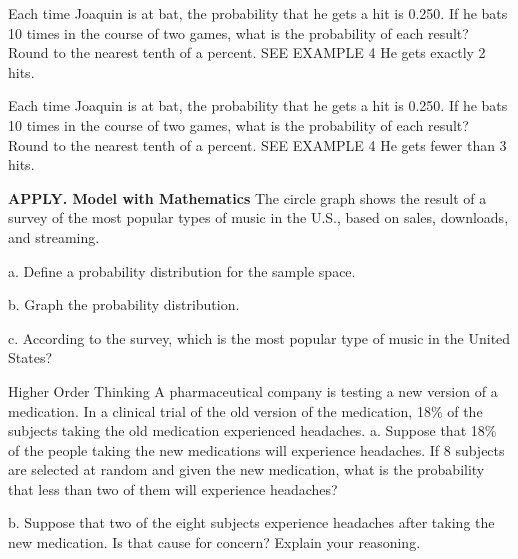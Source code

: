 \documentclass{article}
\newenvironment{practice}[2]{}{}        %
\newcommand{\answer}[1]{}               %
\newcommand{\placeholder}[2]{}          %
\begin{document}
\begin{practice}{25}{1}
Each time Joaquin is at bat, the probability that he gets a hit is 0.250. If he bats 10 times in the course of two games, what is the probability of each result? Round to the nearest tenth of a percent. SEE EXAMPLE 4
He gets exactly 2 hits.
\answer{28.2\%}
\end{practice}
\begin{practice}{26}{2}
Each time Joaquin is at bat, the probability that he gets a hit is 0.250. If he bats 10 times in the course of two games, what is the probability of each result? Round to the nearest tenth of a percent. SEE EXAMPLE 4
He gets fewer than 3 hits.
\answer{52.6\%}
\end{practice}
\begin{practice}{27}{1}
\textbf{APPLY. Model with Mathematics} The circle graph shows the result of a survey of the most popular types of music in the U.S., based on sales, downloads, and streaming.
\placeholder{graph}{Most Popular Music Genres circle chart, clockwise from top: Rock pink 30 percent with guitar, Hip-Hop R and B peach 22 percent with keyboard, Pop pale green 19 percent with microphone, Country pale yellow 10 percent, Other lavender 19 percent with notes. White radial borders and orange banner behind.}
a. Define a probability distribution for the sample space.
\answer{a. Let P be the function, defined on the set \{Rock, Hip-Hop, Pop, Country, Other\} such that (P(Rock)=30\%), (P(Hip\text{-}Hop)=22\%), (P(Pop)=19\%), (P(Country)=10\%), (P(Other)=19\%).}
b. Graph the probability distribution.
\answer{b. See graph.}
\placeholder{graph}{Most Popular Music Genres: adjacent orange bars at Genre Rock, Hip-Hop, Pop, Country, Other with heights .30,.22,.19,.10,.19. Labels slant up-right. Vertical Probability 0.0-.5 by .1, dotted horizontal grid, no arrows.}
c. According to the survey, which is the most popular type of music in the United States?
\answer{c. rock}
\end{practice}
\begin{practice}{28}{3}
Higher Order Thinking A pharmaceutical company is testing a new version of a medication. In a clinical trial of the old version of the medication, 18\% of the subjects taking the old medication experienced headaches.
a. Suppose that 18\% of the people taking the new medications will experience headaches. If 8 subjects are selected at random and given the new medication, what is the probability that less than two of them will experience headaches?
\answer{a. approximately 56\%}
b. Suppose that two of the eight subjects experience headaches after taking the new medication. Is that cause for concern? Explain your reasoning.
\answer{b. Sample: No; a sample set of 8 people is too small. To make an informed decision, the pharmaceutical company should allow more people to test the new medication.}
\end{practice}
\end{document}
